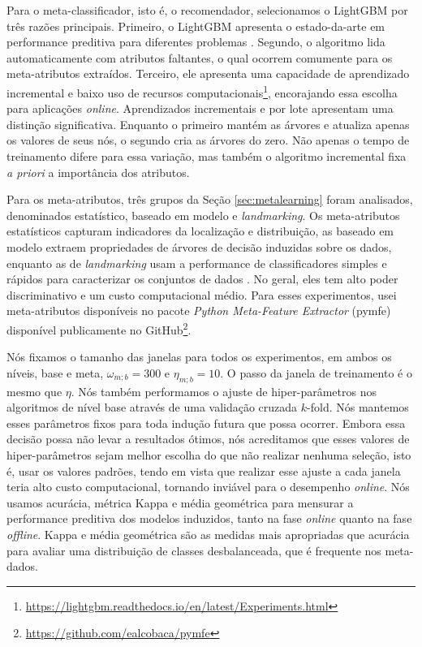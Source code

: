 Para o meta-classificador, isto é, o recomendador, selecionamos o LightGBM por três razões principais. Primeiro, o LightGBM apresenta o estado-da-arte em performance preditiva para diferentes problemas \cite{ke2017lightgbm}. Segundo, o algoritmo lida automaticamente com atributos faltantes, o qual ocorrem comumente para os meta-atributos extraídos. Terceiro, ele apresenta uma capacidade de aprendizado incremental e baixo uso de recursos computacionais\footnote{\url{https://lightgbm.readthedocs.io/en/latest/Experiments.html}}, encorajando essa escolha para aplicações \textit{online}. Aprendizados incrementais e por lote apresentam uma distinção significativa. Enquanto o primeiro mantém as árvores e atualiza apenas os valores de seus nós, o segundo cria as árvores do zero. Não apenas o tempo de treinamento difere para essa variação, mas também o algoritmo incremental fixa \textit{a priori} a importância dos atributos.

Para os meta-atributos, três grupos da Seção \ref{sec:metalearning} foram analisados, denominados estatístico, baseado em modelo e \textit{landmarking}. Os meta-atributos estatísticos capturam indicadores da localização e distribuição, as baseado em modelo extraem propriedades de árvores de decisão induzidas sobre os dados, enquanto as de \textit{landmarking} usam a performance de classificadores simples e rápidos para caracterizar os conjuntos de dados \cite{Rivolli2018}. No geral, eles tem alto poder discriminativo e um custo computacional médio. Para esses experimentos, usei meta-atributos disponíveis no pacote \textit{Python Meta-Feature Extractor} (pymfe) \cite{pymfe2020} disponível publicamente no GitHub\footnote{\url{https://github.com/ealcobaca/pymfe}}.

Nós fixamos o tamanho das janelas para todos os experimentos, em ambos os níveis, base e meta,
$\omega_{m;b} = 300$ e $\eta_{m;b} = 10$. O passo da janela de treinamento é o mesmo que $\eta$.
Nós também performamos o ajuste de hiper-parâmetros nos algoritmos de nível base através de uma
validação cruzada $k$-fold. Nós mantemos esses parâmetros fixos para toda indução futura que possa
ocorrer. Embora essa decisão possa não levar a resultados ótimos, nós acreditamos que esses 
valores de hiper-parâmetros sejam melhor escolha do que não realizar nenhuma seleção, isto é,
usar os valores padrões, tendo em vista que realizar esse ajuste a cada janela teria alto custo computacional, tornando inviável para o desempenho \textit{online}. Nós usamos acurácia, métrica Kappa e
média geométrica para mensurar a performance preditiva dos modelos induzidos, tanto na fase \textit{online}
quanto na fase \textit{offline}. Kappa e média geométrica são as medidas mais apropriadas que acurácia
para avaliar uma distribuição de classes desbalanceada, que é frequente nos meta-dados.

